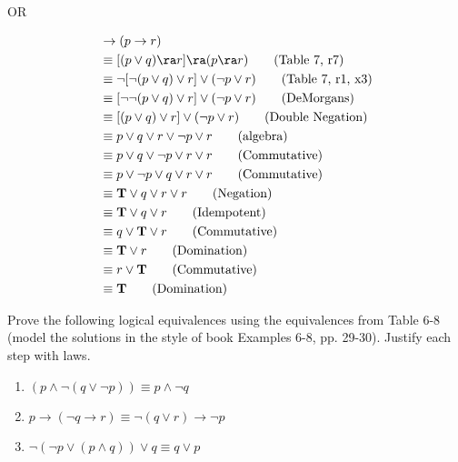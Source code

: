 \begin{questions}
\begin{solution}
  \begin{center}
  OR
  \end{center}
  \vspace{-20pt}
  \begin{align*}
    [(p \rightarrow q) \wedge (q \rightarrow r)] &\rightarrow (p \rightarrow r) \\
    & \equiv [(p \vee q) \ra r] \ra (p \ra r) \tag{Table 7, r7} \\
    & \equiv \neg[\neg(p \vee q) \vee r] \vee (\neg p \vee r) \tag{Table 7, r1, x3} \\
    & \equiv [\neg \neg (p \vee q) \vee r] \vee (\neg p \vee r) \tag{DeMorgans} \\
    & \equiv [(p \vee q) \vee r] \vee (\neg p \vee r) \tag{Double Negation} \\
    & \equiv p \vee q \vee r \vee \neg p \vee r  \tag{algebra} \\
    & \equiv p \vee q \vee \neg p \vee r \vee r \tag{Commutative} \\
    & \equiv p \vee \neg p \vee q \vee r \vee r \tag{Commutative} \\
    & \equiv \mathbf{T} \vee q \vee r \vee r \tag{Negation} \\
    & \equiv \mathbf{T} \vee q \vee r \tag{Idempotent} \\
    & \equiv q \vee \mathbf{T} \vee r \tag{Commutative} \\
    & \equiv \mathbf{T} \vee r \tag{Domination} \\
    & \equiv r \vee \mathbf{T} \tag{Commutative} \\
    & \equiv \mathbf{T} \tag{Domination}
  \end{align*}
  \end{solution}


\newpage
{} Prove the following logical equivalences using the
equivalences from Table 6-8 (model the solutions in the style of
book Examples 6-8, pp. 29-30).  Justify each step with laws.
\begin{enumerate}[label=(\alph*),itemsep=0pt,parsep=0pt,topsep=0pt,partopsep=0pt]
    \item $(p \wedge \neg(q \vee \neg p)) \equiv p \wedge \neg q$
    \item $p \rightarrow (\neg q \rightarrow r) \equiv \neg(q \vee r)
    \rightarrow \neg p$
    \item $\neg(\neg p \vee (p \wedge q)) \vee q \equiv q \vee p $
\end{enumerate}


\end{questions}
